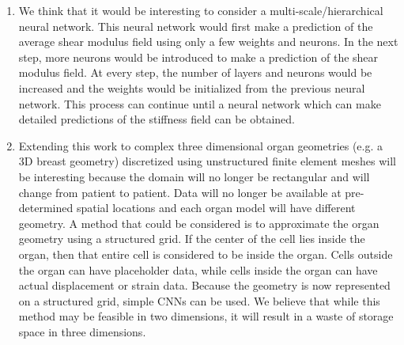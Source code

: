 \documentclass[12pt]{article}
\begin{document}
\begin{enumerate}
\item{We think that it would be interesting to consider a multi-scale/hierarchical neural network. This neural network would first make a prediction of the average shear modulus field using only a few weights and neurons. In the next step, more neurons would be introduced to make a prediction of the shear modulus field. At every step, the number of layers and neurons would be increased and the weights would be initialized from the previous neural network. This process can continue until a neural network which can make detailed predictions of the stiffness field can be obtained.}
\item{Extending this work to complex three dimensional organ geometries (e.g. a 3D breast geometry) discretized using unstructured finite element meshes will be interesting because the domain will no longer be rectangular and will change from patient to patient. Data will no longer be available at pre-determined spatial locations and each organ model will have different geometry.  A method that could be considered is to approximate the organ geometry using a structured grid. If the center of the cell lies inside the organ, then that entire cell is considered to be inside the organ. Cells outside the organ can have placeholder data, while cells inside the organ can have actual displacement or strain data. Because the geometry is now represented on a structured grid, simple CNNs can be used. We believe that while this method may be feasible in two dimensions, it will result in a waste of storage space in three dimensions.}

\end{enumerate}
\end{document}

